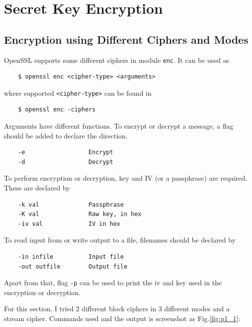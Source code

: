 \section{Secret Key Encryption}

\subsection{Encryption using Different Ciphers and Modes}

OpenSSL supports some different ciphers in module \texttt{enc}.
It can be used as 
\begin{verbatim}
    $ openssl enc <cipher-type> <arguments>
\end{verbatim}
where supported \texttt{<cipher-type>} can be found in 
\begin{verbatim}
    $ openssl enc -ciphers
\end{verbatim}

Arguments have different functions. 
To encrypt or decrypt a message, a flag should be added to declare the direction.
\begin{verbatim}
    -e                  Encrypt
    -d                  Decrypt
\end{verbatim}
To perform encryption or decryption, key and IV (or a passphrase) are required. These are declared by 
\begin{verbatim}
    -k val              Passphrase
    -K val              Raw key, in hex
    -iv val             IV in hex
\end{verbatim}
To read input from or write output to a file, filenames should be declared by 
\begin{verbatim}
    -in infile          Input file
    -out outfile        Output file
\end{verbatim}
Apart from that, flag \texttt{-p} can be used to print the iv and key used in the encryption or decryption.

For this section, I tried 2 different block ciphers in 3 different modes and a stream cipher.
Commands used and the output is screenshot as Fig.\ref{fig:p1_1}:

